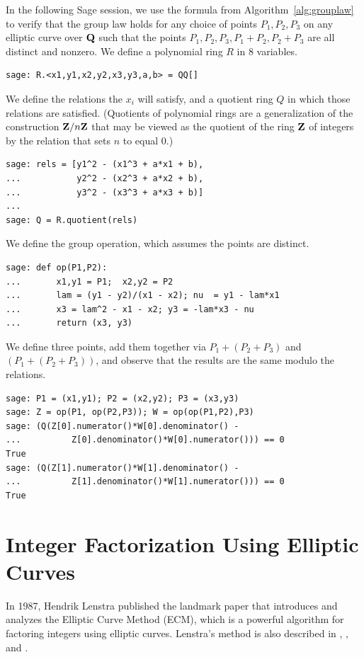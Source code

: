 \begin{sg}
  In the following Sage session, we use the formula from
  Algorithm~\ref{alg:grouplaw} to verify that the group law holds for
  any choice of points $P_1, P_2, P_3$ on any elliptic curve over $\mathbf{Q}$
  such that the points $P_1, P_2, P_3, P_1+P_2, P_2+P_3$ are all
  distinct and nonzero.  We define a polynomial ring $R$ in 8
  variables.
\begin{verbatim}
sage: R.<x1,y1,x2,y2,x3,y3,a,b> = QQ[]
\end{verbatim}%
\vspace{1ex}

\noindent{}We define the relations the $x_i$ will satisfy, and a
quotient ring $Q$ in which those relations are satisfied.  (Quotients
of polynomial rings are a generalization of the construction $\mathbf{Z}/n\mathbf{Z}$
that may be viewed as the quotient of the ring $\mathbf{Z}$ of integers by the
relation that sets $n$ to equal $0$.)
\begin{verbatim}
sage: rels = [y1^2 - (x1^3 + a*x1 + b),
...           y2^2 - (x2^3 + a*x2 + b),
...           y3^2 - (x3^3 + a*x3 + b)]
...
sage: Q = R.quotient(rels)
\end{verbatim}%
\vspace{1ex}

\noindent{}We define the group operation, which assumes the points are distinct.
\begin{verbatim}
sage: def op(P1,P2):
...       x1,y1 = P1;  x2,y2 = P2
...       lam = (y1 - y2)/(x1 - x2); nu  = y1 - lam*x1
...       x3 = lam^2 - x1 - x2; y3 = -lam*x3 - nu
...       return (x3, y3)
\end{verbatim}%
\vspace{1ex}

\noindent{}We define three points, add them together via $P_1 + (P_2 + P_3)$
and $(P_1 + (P_2 + P_3))$, and observe that the results are the same modulo the relations.
\begin{verbatim}
sage: P1 = (x1,y1); P2 = (x2,y2); P3 = (x3,y3)
sage: Z = op(P1, op(P2,P3)); W = op(op(P1,P2),P3)
sage: (Q(Z[0].numerator()*W[0].denominator() -
...          Z[0].denominator()*W[0].numerator())) == 0
True
sage: (Q(Z[1].numerator()*W[1].denominator() -
...          Z[1].denominator()*W[1].numerator())) == 0
True
\end{verbatim}
\end{sg}


\section{Integer Factorization Using Elliptic Curves}
\label{sec:ecm}
In 1987, Hendrik Lenstra
published the landmark paper
\cite{lenstra:factorell} that introduces and analyzes
the Elliptic Curve Method (ECM), which is
a powerful algorithm for factoring integers
using elliptic curves.  Lenstra's method is also described in
\cite[\S IV.4]{silvermantate},
\cite[\S VIII.5]{davenport},  and
\cite[\S 10.3]{cohen:ant}.

